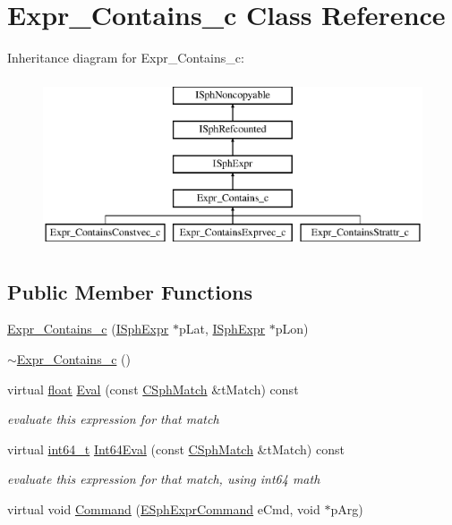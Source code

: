 \hypertarget{classExpr__Contains__c}{\section{Expr\-\_\-\-Contains\-\_\-c Class Reference}
\label{classExpr__Contains__c}
}
Inheritance diagram for Expr\-\_\-\-Contains\-\_\-c\-:\begin{figure}[H]
\begin{center}
\leavevmode
\includegraphics[height=5.000000cm]{classExpr__Contains__c}
\end{center}
\end{figure}
\subsection*{Public Member Functions}
\begin{DoxyCompactItemize}
\item 
\hyperlink{classExpr__Contains__c_a717ef43408ff640bbe43183880b99ff4}{Expr\-\_\-\-Contains\-\_\-c} (\hyperlink{structISphExpr}{I\-Sph\-Expr} $\ast$p\-Lat, \hyperlink{structISphExpr}{I\-Sph\-Expr} $\ast$p\-Lon)
\item 
\hyperlink{classExpr__Contains__c_ab1831196c253cd0fc207df2fd30ec072}{$\sim$\-Expr\-\_\-\-Contains\-\_\-c} ()
\item 
virtual \hyperlink{sphinxexpr_8cpp_a0e0d0739f7035f18f949c2db2c6759ec}{float} \hyperlink{classExpr__Contains__c_adbb3bbb098de124c74b8cf7246b96dd0}{Eval} (const \hyperlink{classCSphMatch}{C\-Sph\-Match} \&t\-Match) const 
\begin{DoxyCompactList}\small\item\em evaluate this expression for that match \end{DoxyCompactList}\item 
virtual \hyperlink{sphinxstd_8h_a996e72f71b11a5bb8b3b7b6936b1516d}{int64\-\_\-t} \hyperlink{classExpr__Contains__c_a0e51eb0d361b133c7a5db69bdb2f68db}{Int64\-Eval} (const \hyperlink{classCSphMatch}{C\-Sph\-Match} \&t\-Match) const 
\begin{DoxyCompactList}\small\item\em evaluate this expression for that match, using int64 math \end{DoxyCompactList}\item 
virtual void \hyperlink{classExpr__Contains__c_a951ad0917eece06d2466dbc81301ea94}{Command} (\hyperlink{sphinxexpr_8h_a30be184fb07bd80c271360fc6094c818}{E\-Sph\-Expr\-Command} e\-Cmd, void $\ast$p\-Arg)
\end{DoxyCompactItemize}
